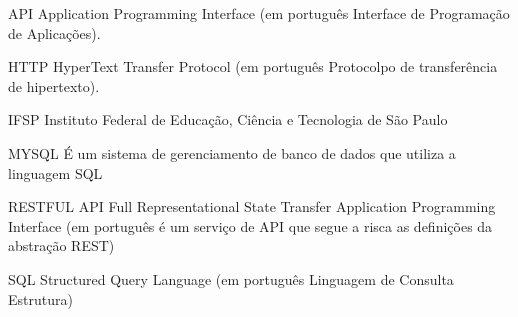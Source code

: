 \begin{siglas}
  \item{API} Application Programming Interface (em português Interface de Programação de Aplicações).
  \item{HTTP} HyperText Transfer Protocol (em português Protocolpo de transferência de hipertexto).
  \item{IFSP} Instituto Federal de Educação, Ciência e Tecnologia de São Paulo
  \item{MYSQL} É um sistema de gerenciamento de banco de dados que utiliza a linguagem SQL
  \item{RESTFUL API} Full Representational State Transfer Application Programming Interface (em português é um serviço de API que segue a risca as definições da abstração REST)
  \item{SQL} Structured Query Language (em português Linguagem de Consulta Estrutura)
\end{siglas}
